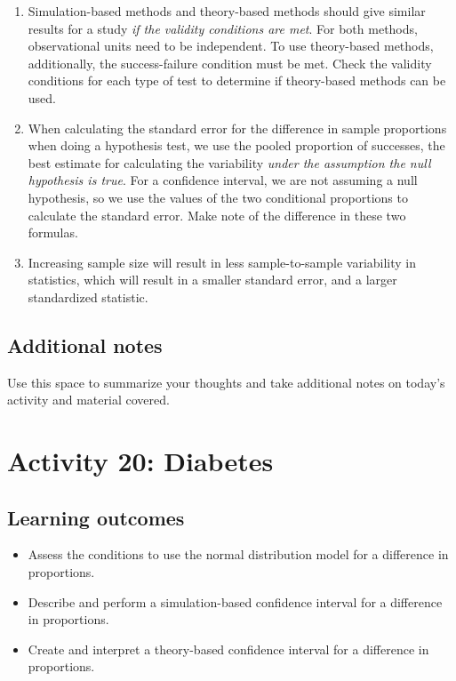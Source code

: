 \documentclass[
]{report}
\begin{document}
\begin{enumerate}
\def\labelenumi{\arabic{enumi}.}
\item
  Simulation-based methods and theory-based methods should give similar results for a study \emph{if the validity conditions are met}. For both methods, observational units need to be independent. To use theory-based methods, additionally, the success-failure condition must be met. Check the validity conditions for each type of test to determine if theory-based methods can be used.
\item
  When calculating the standard error for the difference in sample proportions when doing a hypothesis test, we use the pooled proportion of successes, the best estimate for calculating the variability \emph{under the assumption the null hypothesis is true}. For a confidence interval, we are not assuming a null hypothesis, so we use the values of the two conditional proportions to calculate the standard error. Make note of the difference in these two formulas.
\item
  Increasing sample size will result in less sample-to-sample variability in statistics, which will result in a smaller standard error, and a larger standardized statistic.
\end{enumerate}

\subsection{Additional notes}\label{additional-notes-18}

Use this space to summarize your thoughts and take additional notes on today's activity and material covered.

\newpage

\section{Activity 20: Diabetes}\label{activity-20-diabetes}


\subsection{Learning outcomes}\label{learning-outcomes-21}

\begin{itemize}
\item
  Assess the conditions to use the normal distribution model for a difference in proportions.
\item
  Describe and perform a simulation-based confidence interval for a difference in proportions.
\item
  Create and interpret a theory-based confidence interval for a difference in proportions.
\end{itemize}
\end{document}
